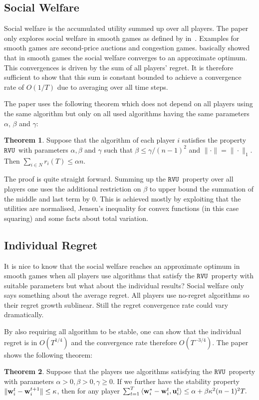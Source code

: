 \documentclass[a4paper]{article}
\theoremstyle{definition}
\newtheorem{theorem}{Theorem}
\newcommand{\myprop}{\ensuremath{\texttt{RVU}}}
\newcommand{\mst}{\ensuremath{w}}
\newcommand{\stable}{\ensuremath{\kappa}}
\renewcommand{\vec}[1]{\ensuremath{{\bf #1}}}
\newcommand{\dotp}[2]{\ensuremath{\left\langle #1, #2 \right\rangle}}
\begin{document}
\subsection{Social Welfare}
Social welfare is the accumulated utility summed up over all players.
The paper only explores social welfare in smooth games as defined by
\citeauthor{Roughgarden:2009:IRP:1536414.1536485} in~\cite{Roughgarden:2009:IRP:1536414.1536485}.
Examples for smooth games are second-price auctions and congestion
games.
\citeauthor{Roughgarden:2009:IRP:1536414.1536485} basically showed
that in smooth games the social welfare converges to an approximate
optimum.
This convergences is driven by the sum of all players' regret.
It is therefore sufficient to show that this sum is constant bounded
to achieve a convergence rate of $O(1/T)$ due to averaging over all
time steps.

The paper uses the following theorem which does not depend on all
players using the same algorithm but only on all used algorithms having the
same parameters $\alpha$, $\beta$ and $\gamma$:

\begin{theorem}\label{thm:sufficient}
Suppose that the algorithm of each player $i$ satisfies the property
\myprop~with parameters $\alpha, \beta$ and $\gamma$ such that
$\beta\leq \gamma/(n-1)^2$ and $\|\cdot\| = \|\cdot\|_1$. Then
$\sum_{i\in N} r_i(T) \leq \alpha n$.
\end{theorem}


The proof is quite straight forward.
Summing up the \myprop~property over all players one uses the
additional restriction on $\beta$ to upper bound the summation of the
middle and last term by 0. This is achieved mostly by exploiting that
the utilities are normalised, Jensen's
inequality for convex functions (in this case squaring) and some facts
about total variation.


\subsection{Individual Regret}
It is nice to know that the social welfare reaches an approximate
optimum in smooth games when all players use algorithms that satisfy
the \myprop~property with suitable parameters but what about the
individual results?
Social welfare only says something about the average regret.
All players use no-regret algorithms so their regret growth sublinear.
Still the regret convergence rate could vary dramatically.

By also requiring all algorithm to be stable, one can show that the
individual regret is in $O(T^{1/4})$ and the convergence rate
therefore $O(T^{-3/4})$.
The paper shows the following theorem:
\setcounter{theorem}{10}
\begin{theorem}\label{thm:sufficient-2}
Suppose that the players use algorithms satisfying the
\myprop~property with parameters $\alpha > 0, \beta > 0,\gamma \geq
0$. If we further have the stability property $\|\vec{\mst}_i^t -
\vec{\mst}_i^{t+1}\|\leq \stable$, then for any player
$\sum_{t=1}^{T} \dotp{\vec{\mst}_i^*-\vec{\mst}_i^t}{ \vec{u}_i^t}\leq
\alpha + \beta \stable^2 (n-1)^2 T.$
\end{theorem}
\end{document}
